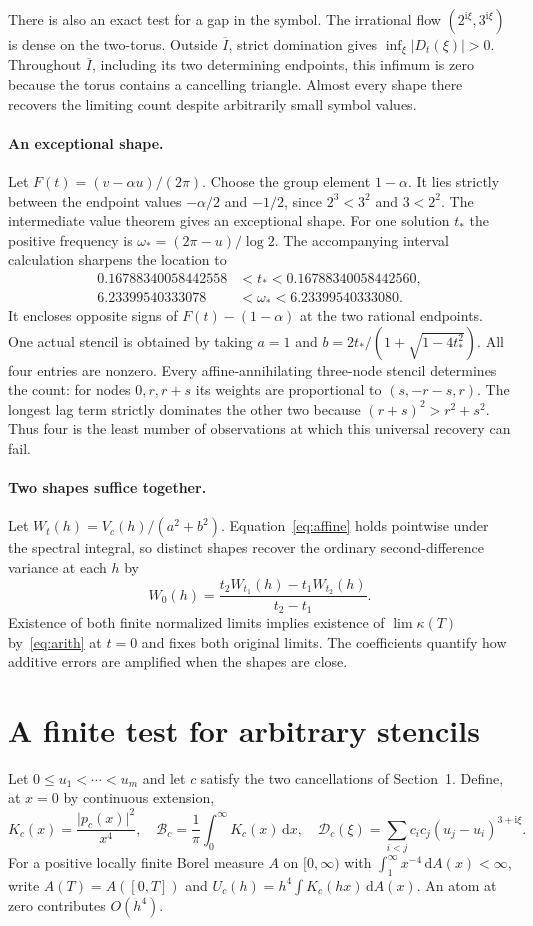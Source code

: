 \documentclass[11pt,letterpaper]{article}
\newcommand{\dd}{\,\mathrm d}
\newcommand{\ii}{\mathrm i}
\newcommand{\abs}[1]{\lvert#1\rvert}
\newcommand{\sym}{\mathcal D}
\newcommand{\BB}{\mathcal B}
\begin{document}
There is also an exact test for a gap in the symbol. The irrational flow $(2^{\ii\xi},3^{\ii\xi})$ is dense on the two-torus. Outside $\overline I$, strict domination gives $\inf_\xi\abs{D_t(\xi)}>0$. Throughout $\overline I$, including its two determining endpoints, this infimum is zero because the torus contains a cancelling triangle. Almost every shape there recovers the limiting count despite arbitrarily small symbol values.

\paragraph{An exceptional shape.}
Let $F(t)=(v-\alpha u)/(2\pi)$. Choose the group element $1-\alpha$. It lies strictly between the endpoint values $-\alpha/2$ and $-1/2$, since $2^3<3^2$ and $3<2^2$. The intermediate value theorem gives an exceptional shape. For one solution $t_*$ the positive frequency is $\omega_*=(2\pi-u)/\log2$. The accompanying interval calculation sharpens the location to
\[
 \begin{split}
 0.16788340058442558&<t_*<0.16788340058442560,\\
 6.23399540333078&<\omega_*<6.23399540333080 .
 \end{split}
\]
It encloses opposite signs of $F(t)-(1-\alpha)$ at the two rational endpoints. One actual stencil is obtained by taking $a=1$ and $b=2t_* /(1+\sqrt{1-4t_*^2})$. All four entries are nonzero. Every affine-annihilating three-node stencil determines the count: for nodes $0,r,r+s$ its weights are proportional to $(s,-r-s,r)$. The longest lag term strictly dominates the other two because $(r+s)^2>r^2+s^2$. Thus four is the least number of observations at which this universal recovery can fail.

\paragraph{Two shapes suffice together.}
Let $W_t(h)=V_c(h)/(a^2+b^2)$. Equation~\eqref{eq:affine} holds pointwise under the spectral integral, so distinct shapes recover the ordinary second-difference variance at each $h$ by
\[
 W_0(h)=\frac{t_2W_{t_1}(h)-t_1W_{t_2}(h)}{t_2-t_1}.
\]
Existence of both finite normalized limits implies existence of $\lim\kappa(T)$ by~\eqref{eq:arith} at $t=0$ and fixes both original limits. The coefficients quantify how additive errors are amplified when the shapes are close.
\section{A finite test for arbitrary stencils}\label{sec:general}
Let $0\le u_1<\cdots<u_m$ and let $c$ satisfy the two cancellations of Section~1. Define, at $x=0$ by continuous extension,
\[
 K_c(x)=\frac{\abs{p_c(x)}^2}{x^4},\quad
 \BB_c=\frac1\pi\int_0^\infty K_c(x)\dd x,\quad
 \sym_c(\xi)=\sum_{i<j}c_ic_j(u_j-u_i)^{3+\ii\xi}.
\]
For a positive locally finite Borel measure $A$ on $[0,\infty)$ with $\int_1^\infty x^{-4}\dd A(x)<\infty$, write $A(T)=A([0,T])$ and $U_c(h)=h^4\int K_c(hx)\dd A(x)$. An atom at zero contributes $O(h^4)$.
\end{document}
